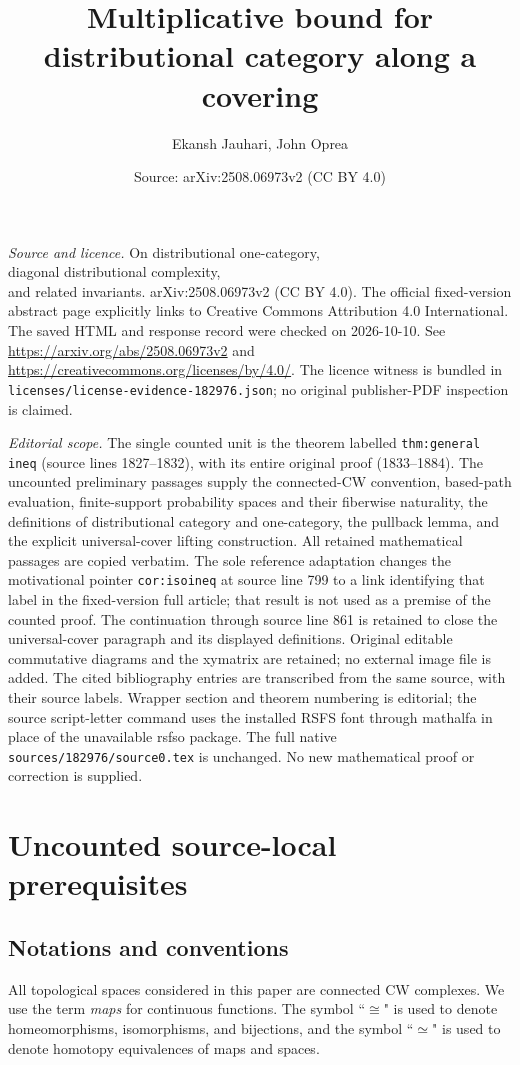\documentclass[10pt,a4paper]{amsart}
\title{Multiplicative bound for distributional category along a covering}
\author{Ekansh Jauhari, John Oprea}
\date{Source: arXiv:2508.06973v2 (CC BY 4.0)}
\theoremstyle{definition}
\begin{document}
\maketitle
\noindent\emph{Source and licence.} On distributional one-category, \\ diagonal distributional complexity, \\ and related invariants. arXiv:2508.06973v2 (CC BY 4.0). The official fixed-version abstract page explicitly links to Creative Commons Attribution 4.0 International. The saved HTML and response record were checked on 2026-10-10. See \url{https://arxiv.org/abs/2508.06973v2} and \url{https://creativecommons.org/licenses/by/4.0/}. The licence witness is bundled in \texttt{licenses/license-evidence-182976.json}; no original publisher-PDF inspection is claimed.\par\smallskip
\noindent\textit{Editorial scope.} The single counted unit is the theorem labelled \texttt{thm:general ineq} (source lines 1827--1832), with its entire original proof (1833--1884). The uncounted preliminary passages supply the connected-CW convention, based-path evaluation, finite-support probability spaces and their fiberwise naturality, the definitions of distributional category and one-category, the pullback lemma, and the explicit universal-cover lifting construction. All retained mathematical passages are copied verbatim. The sole reference adaptation changes the motivational pointer \texttt{cor:isoineq} at source line 799 to a link identifying that label in the fixed-version full article; that result is not used as a premise of the counted proof. The continuation through source line 861 is retained to close the universal-cover paragraph and its displayed definitions. Original editable commutative diagrams and the xymatrix are retained; no external image file is added. The cited bibliography entries are transcribed from the same source, with their source labels. Wrapper section and theorem numbering is editorial; the source script-letter command uses the installed RSFS font through mathalfa in place of the unavailable rsfso package. The full native \texttt{sources/182976/source0.tex} is unchanged. No new mathematical proof or correction is supplied.
\section*{Uncounted source-local prerequisites}
\subsection*{Notations and conventions} All topological spaces considered in this paper are connected CW complexes. We use the term \emph{maps} for continuous functions. The symbol ``$\cong$" is used to denote homeomorphisms, isomorphisms, and bijections, and the symbol ``$\simeq$" is used to denote homotopy equivalences of maps and spaces. 
\end{document}
